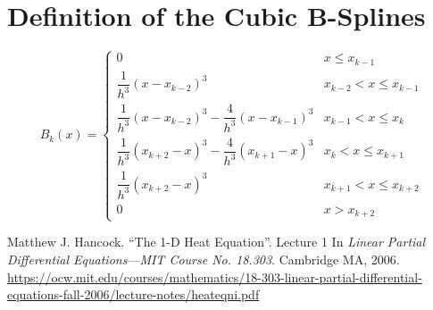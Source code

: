\documentclass[11pt, a4paper]{article}
\begin{document}
\section{Definition of the Cubic B-Splines} \label{spec:s:b-splines}
\begin{equation*}
	B_{k}(x) = 
	\begin{cases}
		0 & x \leq x_{k-1}\\[2mm]
		\dfrac{1}{h^{3}}(x-x_{k-2})^{3} & x_{k-2} < x \leq x_{k-1}\\[3mm]
		\dfrac{1}{h^{3}}(x-x_{k-2})^{3} - \dfrac{4}{h^{3}}(x - x_{k-1})^{3} & x_{k-1} < x \leq x_{k}\\[3mm]
		\dfrac{1}{h^{3}}(x_{k+2}-x)^{3} - \dfrac{4}{h^{3}}(x_{k+1} - x)^{3} & x_{k} < x \leq x_{k+1}\\[3mm]
		\dfrac{1}{h^{3}}(x_{k+2}-x)^{3} & x_{k+1} < x \leq x_{k+2}\\[2mm]
		0 & x > x_{k+2}
	\end{cases}
\end{equation*}

\begin{thebibliography}{}
\setlength{\itemsep}{.2\itemsep}\setlength{\parsep}{.5\parsep}

 Matthew J. Hancock. ``The 1-D Heat Equation''. Lecture 1 In \textit{Linear Partial Differential Equations}---\textit{MIT Course No. 18.303}. Cambridge MA, 2006.
\url{https://ocw.mit.edu/courses/mathematics/18-303-linear-partial-differential-equations-fall-2006/lecture-notes/heateqni.pdf}

\end{thebibliography}
\end{document}
